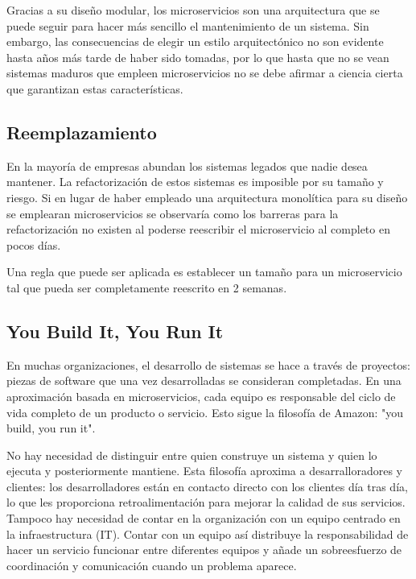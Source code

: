 \documentclass[11pt,spanish,listoffigures,listoftables]{tfgetsinf}
\begin{document}
Gracias a su diseño modular, los microservicios son una arquitectura que se puede seguir para hacer más sencillo el mantenimiento de un sistema. Sin embargo, las consecuencias de elegir un estilo arquitectónico no son evidente hasta años más tarde de haber sido tomadas, por lo que hasta que no se vean sistemas maduros que empleen microservicios no se debe afirmar a ciencia cierta que garantizan estas características. \cite{Lewis2014}

\subsection{Reemplazamiento}

En la mayoría de empresas abundan los sistemas legados que nadie desea mantener. La refactorización de estos sistemas es imposible por su tamaño y riesgo. Si en lugar de haber empleado una arquitectura monolítica para su diseño se emplearan microservicios se observaría como los barreras para la refactorización no existen al poderse reescribir el microservicio al completo en pocos días.

Una regla que puede ser aplicada es establecer un tamaño para un microservicio tal que pueda ser completamente reescrito en 2 semanas. \cite{Newman2015a}

\subsection{You Build It, You Run It}

En muchas organizaciones, el desarrollo de sistemas se hace a través de proyectos: piezas de software que una vez desarrolladas se consideran completadas. En una aproximación basada en microservicios, cada equipo es responsable del ciclo de vida completo de un producto o servicio. Esto sigue la filosofía de Amazon: "you build, you run it". \cite{Lewis2014}

No hay necesidad de distinguir entre quien construye un sistema y quien lo ejecuta y posteriormente mantiene. Esta filosofía aproxima a desarralloradores y clientes: los desarrolladores están en contacto directo con los clientes día tras día, lo que les proporciona retroalimentación para mejorar la calidad de sus servicios. Tampoco hay necesidad de contar en la organización con un equipo centrado en la infraestructura (IT). Contar con un equipo así distribuye la responsabilidad de hacer un servicio funcionar entre diferentes equipos y añade un sobreesfuerzo de coordinación y comunicación cuando un problema aparece. \cite{Vliet2011}
\end{document}
